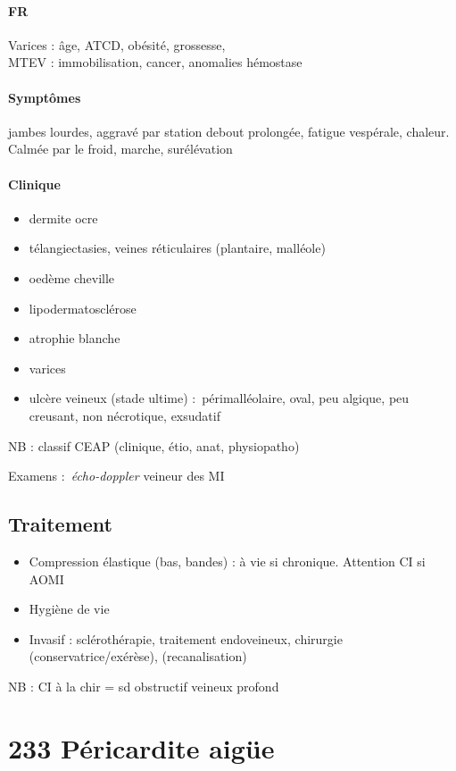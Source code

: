 \documentclass{article}
\begin{document}
\paragraph{FR} Varices : âge, ATCD, obésité, grossesse, \female\\
MTEV : immobilisation, cancer, anomalies hémostase

\paragraph{Symptômes} jambes lourdes, aggravé par station debout prolongée,
fatigue vespérale, chaleur. Calmée par le froid, marche, surélévation

\paragraph{Clinique}
\begin{itemize}
  \item dermite ocre
  \item télangiectasies, veines réticulaires (plantaire, malléole)
  \item oedème cheville
  \item lipodermatosclérose
  \item atrophie blanche
  \item varices
  \item ulcère veineux (stade ultime) : périmalléolaire, oval, peu algique, peu
    creusant, non nécrotique, exsudatif
\end{itemize}
NB : classif CEAP (clinique, étio, anat, physiopatho)

Examens : \textit{écho-doppler}  veineur des MI

\subsection{Traitement}
\begin{itemize}
  \item Compression élastique (bas, bandes) : à vie si chronique. Attention CI si AOMI
  \item Hygiène de vie
  \item Invasif : sclérothérapie, traitement endoveineux, chirurgie (conservatrice/exérèse), (recanalisation)
\end{itemize}
NB : CI à la chir = sd obstructif veineux profond

\section{233 Péricardite aigüe}%
\label{sec:233_pericardite_aigue}
\end{document}
